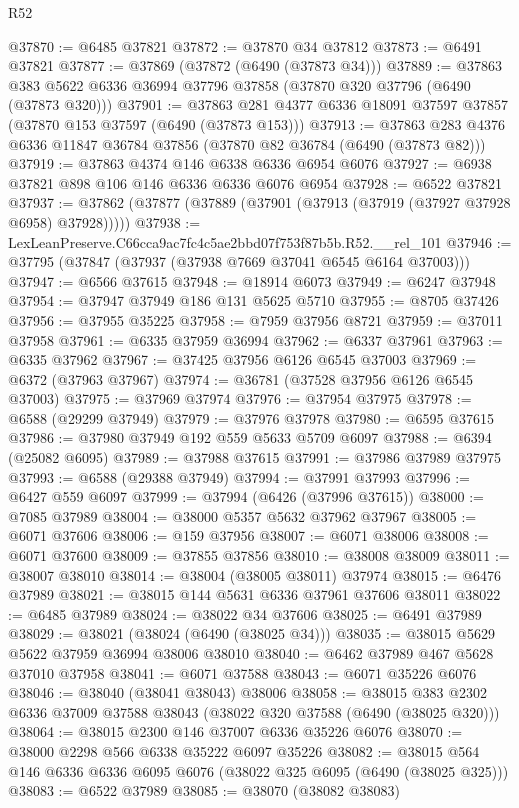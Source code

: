 \begin{lexlean}{R52}
\begin{coremodule}
@37870 := @6485 @37821
@37872 := @37870 @34 @37812
@37873 := @6491 @37821
@37877 := @37869 (@37872 (@6490 (@37873 @34)))
@37889 := @37863 @383 @5622 @6336 @36994 @37796 @37858 (@37870 @320 @37796 (@6490 (@37873 @320)))
@37901 := @37863 @281 @4377 @6336 @18091 @37597 @37857 (@37870 @153 @37597 (@6490 (@37873 @153)))
@37913 := @37863 @283 @4376 @6336 @11847 @36784 @37856 (@37870 @82 @36784 (@6490 (@37873 @82)))
@37919 := @37863 @4374 @146 @6338 @6336 @6954 @6076
@37927 := @6938 @37821 @898 @106 @146 @6336 @6336 @6076 @6954
@37928 := @6522 @37821
@37937 := @37862 (@37877 (@37889 (@37901 (@37913 (@37919 (@37927 @37928 @6958) @37928)))))
@37938 := LexLeanPreserve.C66cca9ac7fc4c5ae2bbd07f753f87b5b.R52.__rel_101
@37946 := @37795 (@37847 (@37937 (@37938 @7669 @37041 @6545 @6164 @37003)))
@37947 := @6566 @37615
@37948 := @18914 @6073
@37949 := @6247 @37948
@37954 := @37947 @37949 @186 @131 @5625 @5710
@37955 := @8705 @37426
@37956 := @37955 @35225
@37958 := @7959 @37956 @8721
@37959 := @37011 @37958
@37961 := @6335 @37959 @36994
@37962 := @6337 @37961
@37963 := @6335 @37962
@37967 := @37425 @37956 @6126 @6545 @37003
@37969 := @6372 (@37963 @37967)
@37974 := @36781 (@37528 @37956 @6126 @6545 @37003)
@37975 := @37969 @37974
@37976 := @37954 @37975
@37978 := @6588 (@29299 @37949)
@37979 := @37976 @37978
@37980 := @6595 @37615
@37986 := @37980 @37949 @192 @559 @5633 @5709 @6097
@37988 := @6394 (@25082 @6095)
@37989 := @37988 @37615
@37991 := @37986 @37989 @37975
@37993 := @6588 (@29388 @37949)
@37994 := @37991 @37993
@37996 := @6427 @559 @6097
@37999 := @37994 (@6426 (@37996 @37615))
@38000 := @7085 @37989
@38004 := @38000 @5357 @5632 @37962 @37967
@38005 := @6071 @37606
@38006 := @159 @37956
@38007 := @6071 @38006
@38008 := @6071 @37600
@38009 := @37855 @37856
@38010 := @38008 @38009
@38011 := @38007 @38010
@38014 := @38004 (@38005 @38011) @37974
@38015 := @6476 @37989
@38021 := @38015 @144 @5631 @6336 @37961 @37606 @38011
@38022 := @6485 @37989
@38024 := @38022 @34 @37606
@38025 := @6491 @37989
@38029 := @38021 (@38024 (@6490 (@38025 @34)))
@38035 := @38015 @5629 @5622 @37959 @36994 @38006 @38010
@38040 := @6462 @37989 @467 @5628 @37010 @37958
@38041 := @6071 @37588
@38043 := @6071 @35226 @6076
@38046 := @38040 (@38041 @38043) @38006
@38058 := @38015 @383 @2302 @6336 @37009 @37588 @38043 (@38022 @320 @37588 (@6490 (@38025 @320)))
@38064 := @38015 @2300 @146 @37007 @6336 @35226 @6076
@38070 := @38000 @2298 @566 @6338 @35222 @6097 @35226
@38082 := @38015 @564 @146 @6336 @6336 @6095 @6076 (@38022 @325 @6095 (@6490 (@38025 @325)))
@38083 := @6522 @37989
@38085 := @38070 (@38082 @38083)

\end{coremodule}
\end{lexlean}
